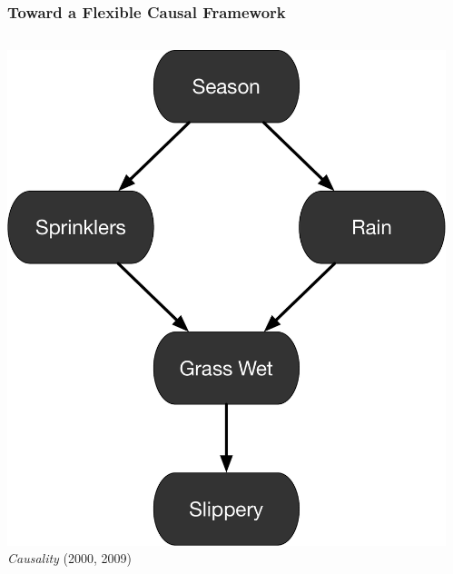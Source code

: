 \documentclass[12pt, block=fill]{beamer}
\begin{document}
\begin{frame}
  \frametitle{Toward a Flexible Causal Framework}
  \begin{columns}
    \begin{column}{0.6\textwidth}
      \centering
      \includegraphics[width=.9\textwidth]{images/sprinklers}
      \textit{Causality} (2000, 2009)
    \end{column}
    \begin{column}{0.4\textwidth} 
      \centering

\end{column}
\end{columns}
\end{frame}
\end{document}
